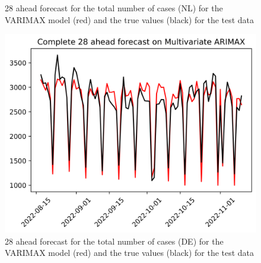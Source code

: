 \begin{figure}
\begin{minipage}{.32\textwidth}
  \caption{28 ahead forecast for the total number of cases (NL) for the VARIMAX model (red) and the true values (black) for the test data}
  \label{fig:tot_cases_fc_28_VARIMAX}
\end{minipage}
\begin{minipage}{.32\textwidth}
  \centering
  \includegraphics[width=\linewidth]{pics/28_ah/DE_Complete_28_ahead_Multivariate ARIMAX.png}
  \caption{28 ahead forecast for the total number of cases (DE) for the VARIMAX model (red) and the true values (black) for the test data}
  \label{fig:tot_cases_fc_28_VARIMAX_DE}
\end{minipage}

\end{figure}
